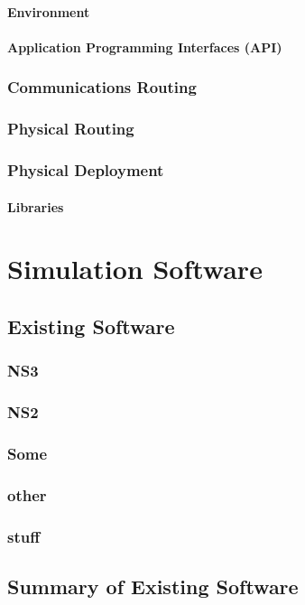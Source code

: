 \documentclass[12pt,a4paper,twoside]{report}
\begin{document}
			\subsubsection{Environment}
			\subsubsection{Application Programming Interfaces (API)}
		\subsection{Communications Routing}
		\subsection{Physical Routing} 
		\subsection{Physical Deployment}
			\subsubsection{Libraries}


\chapter{Simulation Software}
	\section{Existing Software}
		\subsection{NS3}
		\subsection{NS2}
		\subsection{Some}
		\subsection{other}
		\subsection{stuff}
	\section{Summary of Existing Software}
\end{document}
